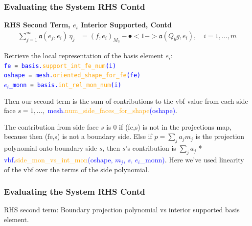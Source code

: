 \documentclass[compress]{beamer}
\begin{document}
\begin{frame}
  \frametitle{Evaluating the System RHS Contd}
  \vspace{-.07cm}
  \textbf{RHS Second Term, $e_i$ Interior Supported, Contd}
  \vspace{-.36cm}
  \begin{align*}
    \sum_{j=1}^m{\mathfrak{a}(e_j, e_i) \,\eta_j} &= (f, e_i)_{M_0} - \spot<1->{\mathfrak{a}(Q_b g, e_i)}, \quad i=1,\dots,m
  \end{align*}
  
  \uncover<+-> {
  Retrieve the local representation of the basis element $e_i$:\\
  \hspace{.2cm} {\small \texttt{\textcolor{blue}{fe \textcolor{black}= basis.\textcolor{orange}{support\_int\_fe\_num}(i)}}}\\
  \hspace{.2cm} {\small \texttt{\textcolor{blue}{oshape \textcolor{black}= mesh.\textcolor{orange}{oriented\_shape\_for\_fe}(fe)}}}\\
  \hspace{.2cm} {\small \texttt{\textcolor{blue}{$e_i$\_monn \textcolor{black}= basis.\textcolor{orange}{int\_rel\_mon\_num}(i)}}}

  \vspace{.2cm}
  Then our second term is the sum of contributions to the vbf value from each side face
  $s = 1,\dots, $ \textcolor{blue}{\small mesh.\textcolor{orange}{num\_side\_faces\_for\_shape}(oshape)}.
  
  The contribution from side face $s$ is $0$ if (fe,s) is not in the projections map, because then (fe,s) is not
  a boundary side.  Else if $p=\sum_j a_j m_j$ is the projection polynomial onto boundary side $s$, then $s$'s contribution is
  $\sum_j {a_j}$ * \textcolor{blue}{vbf.\textcolor{orange}{side\_mon\_vs\_int\_mon}(oshape, $m_j$, $s$, $e_i$\_monn)}.
  Here we've used linearity of the vbf over the terms of the side polynomial.
  }
\end{frame}


\begin{frame}
  \frametitle{Evaluating the System RHS Contd}
  {\scriptsize RHS second term: Boundary projection polynomial vs interior supported basis element.}
\end{frame}
\end{document}
